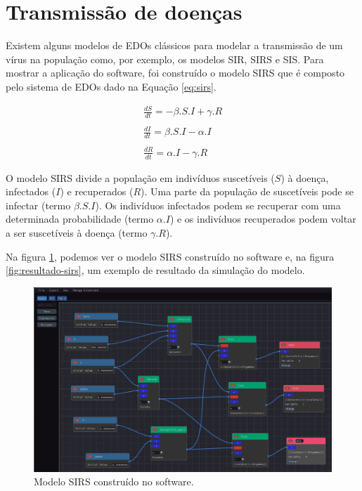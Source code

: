 \documentclass[
	12pt,				%
	openright,			%
	oneside,			%
	a4paper,			%
	main=brazil,
	english,			%
	]{ufsj-abntex2}
\begin{document}
\section{Transmissão de doenças}
Existem alguns modelos de EDOs clássicos para modelar a transmissão de um vírus na população como, por exemplo, os modelos SIR, SIRS e SIS. Para mostrar a aplicação do software, foi construído o modelo SIRS que é composto pelo sistema de EDOs dado na Equação \ref{eq:sirs}. 

\begin{equation}\label{eq:sirs}
    \begin{array}{lr}
    \frac{dS}{dt} = -\beta.S.I + \gamma.R
    \\
    \\
    \frac{dI}{dt} = \beta.S.I - \alpha.I
    \\
    \\ 
    \frac{dR}{dt} = \alpha.I - \gamma.R
    \end{array}
\end{equation}

O modelo SIRS divide a população em indivíduos suscetíveis ($S$) à doença, infectados ($I$) e recuperados ($R$). Uma parte da população de suscetíveis pode se infectar (termo $\beta.S.I$). Os indivíduos infectados podem se recuperar com uma determinada probabilidade (termo $\alpha.I$) e os indivíduos recuperados podem voltar a ser suscetíveis à doença (termo $\gamma.R$).  

Na figura \ref{fig:sirs}, podemos ver o modelo SIRS construído no software e, na figura \ref{fig:resultado-sirs}, um exemplo de resultado da simulação do modelo. 

\begin{figure}[h]
    \centering
    \includegraphics[width=\textwidth]{imgs/modelos/sirs.png} 
    \caption{Modelo SIRS construído no software.}
    \label{fig:sirs}
\end{figure}
\end{document}
